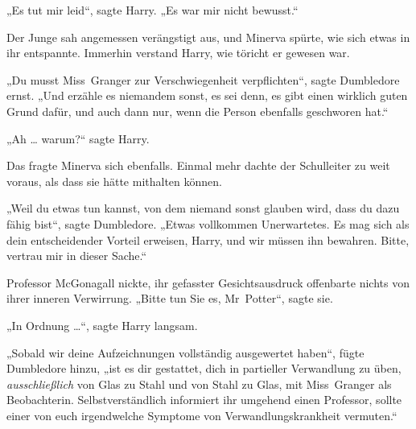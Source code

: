 „Es tut mir leid“, sagte Harry.
„Es war mir nicht bewusst.“

Der Junge sah angemessen verängstigt aus, und Minerva spürte, wie sich etwas in ihr entspannte. Immerhin verstand Harry, wie töricht er gewesen war.

„Du musst Miss~Granger zur Verschwiegenheit verpflichten“, sagte Dumbledore ernst.
„Und erzähle es niemandem sonst, es sei denn, es gibt einen wirklich guten Grund dafür, und auch dann nur, wenn die Person ebenfalls geschworen hat.“

„Ah … warum?“ sagte Harry.

Das fragte Minerva sich ebenfalls. Einmal mehr dachte der Schulleiter zu weit voraus, als dass sie hätte mithalten können.

„Weil du etwas tun kannst, von dem niemand sonst glauben wird, dass du dazu fähig bist“, sagte Dumbledore.
„Etwas vollkommen Unerwartetes. Es mag sich als dein entscheidender Vorteil erweisen, Harry, und wir müssen ihn bewahren. Bitte, vertrau mir in dieser Sache.“

Professor McGonagall nickte, ihr gefasster Gesichtsausdruck offenbarte nichts von ihrer inneren Verwirrung.
„Bitte tun Sie es, Mr~Potter“, sagte sie.

„In Ordnung …“, sagte Harry langsam.

„Sobald wir deine Aufzeichnungen vollständig ausgewertet haben“, fügte Dumbledore hinzu, „ist es dir gestattet, dich in partieller Verwandlung zu üben, \emph{ausschließlich} von Glas zu Stahl und von Stahl zu Glas, mit Miss~Granger als Beobachterin. Selbstverständlich informiert ihr umgehend einen Professor, sollte einer von euch irgendwelche Symptome von Verwandlungskrankheit vermuten.“

